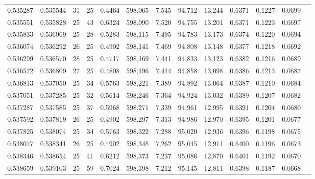 \begin{tabular}{rrrrrrrrrrrrr}
0.535287 & 0.535544 &    31 &  25 &                                     0.4464 & 598,065 &   7,545 &  94,712 &  13,244 & 0.6371 & 0.1227 & 0.0699 \\
0.535551 & 0.535828 &    25 &  43 &                                     0.6324 & 598,090 &   7,520 &  94,755 &  13,201 & 0.6371 & 0.1223 & 0.0697 \\
0.535833 & 0.536069 &    25 &  28 &                                     0.5283 & 598,115 &   7,495 &  94,783 &  13,173 & 0.6374 & 0.1220 & 0.0694 \\
0.536074 & 0.536292 &    26 &  25 &                                     0.4902 & 598,141 &   7,469 &  94,808 &  13,148 & 0.6377 & 0.1218 & 0.0692 \\
0.536299 & 0.536570 &    28 &  25 &                                     0.4717 & 598,169 &   7,441 &  94,833 &  13,123 & 0.6382 & 0.1216 & 0.0689 \\
0.536572 & 0.536809 &    27 &  25 &                                     0.4808 & 598,196 &   7,414 &  94,858 &  13,098 & 0.6386 & 0.1213 & 0.0687 \\
0.536813 & 0.537050 &    25 &  34 &                                     0.5763 & 598,221 &   7,389 &  94,892 &  13,064 & 0.6387 & 0.1210 & 0.0684 \\
0.537051 & 0.537285 &    25 &  32 &                                     0.5614 & 598,246 &   7,364 &  94,924 &  13,032 & 0.6389 & 0.1207 & 0.0682 \\
0.537287 & 0.537585 &    25 &  37 &                                     0.5968 & 598,271 &   7,339 &  94,961 &  12,995 & 0.6391 & 0.1204 & 0.0680 \\
0.537592 & 0.537819 &    26 &  25 &                                     0.4902 & 598,297 &   7,313 &  94,986 &  12,970 & 0.6395 & 0.1201 & 0.0677 \\
0.537825 & 0.538074 &    25 &  34 &                                     0.5763 & 598,322 &   7,288 &  95,020 &  12,936 & 0.6396 & 0.1198 & 0.0675 \\
0.538077 & 0.538341 &    26 &  25 &                                     0.4902 & 598,348 &   7,262 &  95,045 &  12,911 & 0.6400 & 0.1196 & 0.0673 \\
0.538346 & 0.538654 &    25 &  41 &                                     0.6212 & 598,373 &   7,237 &  95,086 &  12,870 & 0.6401 & 0.1192 & 0.0670 \\
0.538659 & 0.539103 &    25 &  59 &                                     0.7024 & 598,398 &   7,212 &  95,145 &  12,811 & 0.6398 & 0.1187 & 0.0668 \\

\end{tabular}
